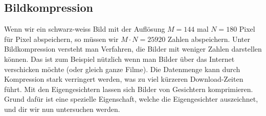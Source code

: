 \subsection{Bildkompression}
Wenn wir ein schwarz-weiss Bild mit der Auflösung $M=144$ mal $N=180$ Pixel für Pixel abspeichern, so müssen wir $M\cdot N=25920$ Zahlen abspeichern.
Unter Bildkompression versteht man Verfahren, die Bilder mit weniger Zahlen darstellen können.
Das ist zum Beispiel nützlich wenn man Bilder über das Internet verschicken möchte (oder gleich ganze Filme).
Die Datenmenge kann durch Kompression stark verringert werden, was zu viel kürzeren Download-Zeiten führt.
Mit den Eigengesichtern lassen sich Bilder von Gesichtern komprimieren.
Grund dafür ist eine spezielle Eigenschaft, welche die Eigengesichter auszeichnet, und dir wir nun untersuchen werden.

